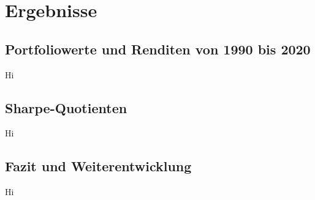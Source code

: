 \documentclass[12pt]{article}
\begin{document}
    \section{Ergebnisse}
    
        \subsection{Portfoliowerte und Renditen von 1990 bis 2020}

        Hi

        \subsection{Sharpe-Quotienten}

        Hi

        \subsection{Fazit und Weiterentwicklung}

        Hi


    \newpage
    \printbibliography[heading=bibintoc, title={Literaturverzeichnis}]
\end{document}
